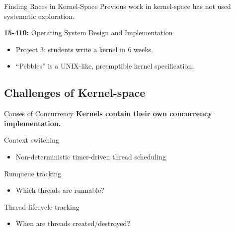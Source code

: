 \documentclass[xcolor=dvipsnames]{beamer}
\begin{document}
\begin{frame}{Finding Races in Kernel-Space} %
	Previous work in kernel-space has not used systematic exploration.
	\linegap

	\textbf{15-410:} Operating System Design and Implementation
	\begin{itemize}
		\item Project 3: students write a kernel in 6 weeks.
		\item ``Pebbles'' is a UNIX-like, preemptible kernel specification.
	\end{itemize}
\end{frame}

\subsection{Challenges of Kernel-space}


\begin{frame}{Causes of Concurrency} %
	\textbf{Kernels contain their own concurrency implementation.}

	\linegap
	Context switching
	\begin{itemize}
		\item Non-deterministic timer-driven thread scheduling
	\end{itemize}
	Runqueue tracking
	\begin{itemize}
		\item Which threads are runnable?
	\end{itemize}
	Thread lifecycle tracking
	\begin{itemize}
		\item When are threads created/destroyed?
	\end{itemize}
\end{frame}

%	
%	
\end{document}
